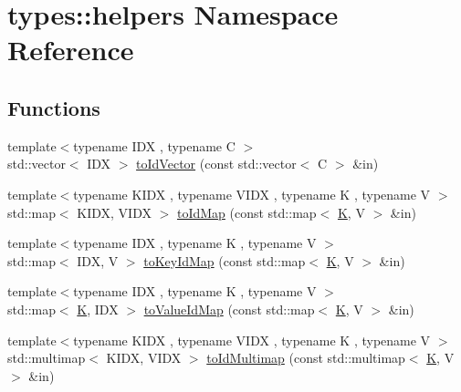 \hypertarget{namespacetypes_1_1helpers}{}\section{types\+::helpers Namespace Reference}
\label{namespacetypes_1_1helpers}
\subsection*{Functions}
\begin{DoxyCompactItemize}
\item 
{\footnotesize template$<$typename I\+DX , typename C $>$ }\\std\+::vector$<$ I\+DX $>$ \mbox{\hyperlink{namespacetypes_1_1helpers_af360dddcd8f311f2615127d623ce96e9}{to\+Id\+Vector}} (const std\+::vector$<$ C $>$ \&in)
\item 
{\footnotesize template$<$typename K\+I\+DX , typename V\+I\+DX , typename K , typename V $>$ }\\std\+::map$<$ K\+I\+DX, V\+I\+DX $>$ \mbox{\hyperlink{namespacetypes_1_1helpers_a554feb54f03216a27fe91d9a1e336f91}{to\+Id\+Map}} (const std\+::map$<$ \mbox{\hyperlink{graphbuilder__shp_8cpp_a891e241aa245ae63618f03737efba309}{K}}, V $>$ \&in)
\item 
{\footnotesize template$<$typename I\+DX , typename K , typename V $>$ }\\std\+::map$<$ I\+DX, V $>$ \mbox{\hyperlink{namespacetypes_1_1helpers_a0d9d21d9a620d7b61b1c1d2e4e84739b}{to\+Key\+Id\+Map}} (const std\+::map$<$ \mbox{\hyperlink{graphbuilder__shp_8cpp_a891e241aa245ae63618f03737efba309}{K}}, V $>$ \&in)
\item 
{\footnotesize template$<$typename I\+DX , typename K , typename V $>$ }\\std\+::map$<$ \mbox{\hyperlink{graphbuilder__shp_8cpp_a891e241aa245ae63618f03737efba309}{K}}, I\+DX $>$ \mbox{\hyperlink{namespacetypes_1_1helpers_a3e4e38a159fe552527d7bfebadb05b4d}{to\+Value\+Id\+Map}} (const std\+::map$<$ \mbox{\hyperlink{graphbuilder__shp_8cpp_a891e241aa245ae63618f03737efba309}{K}}, V $>$ \&in)
\item 
{\footnotesize template$<$typename K\+I\+DX , typename V\+I\+DX , typename K , typename V $>$ }\\std\+::multimap$<$ K\+I\+DX, V\+I\+DX $>$ \mbox{\hyperlink{namespacetypes_1_1helpers_a722d023fde7eb844213adc519c561b55}{to\+Id\+Multimap}} (const std\+::multimap$<$ \mbox{\hyperlink{graphbuilder__shp_8cpp_a891e241aa245ae63618f03737efba309}{K}}, V $>$ \&in)

\end{DoxyCompactItemize}
